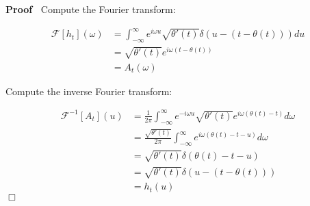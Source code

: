 \documentclass{article}
\newenvironment{proof}{\noindent\textbf{Proof\ }}{\hspace*{\fill}$\Box$\medskip}
\begin{document}
\begin{proof}
  Compute the Fourier transform:
  
  \begin{align}
    \mathcal{F} [h_t] (\omega) & = \int_{- \infty}^{\infty} e^{i \omega u} 
    \sqrt{\theta' (t)} \delta (u - (t - \theta (t))) du \\
    & = \sqrt{\theta' (t)} e^{i \omega (t - \theta (t))} \\
    & = A_t (\omega) 
  \end{align}
  
  Compute the inverse Fourier transform:
  
  \begin{align}
    \mathcal{F}^{- 1} [A_t] (u) & = \frac{1}{2 \pi}  \int_{- \infty}^{\infty}
    e^{- i \omega u}  \sqrt{\theta' (t)} e^{i \omega (\theta (t) - t)} d
    \omega \\
    & = \frac{\sqrt{\theta' (t)}}{2 \pi}  \int_{- \infty}^{\infty} e^{i
    \omega (\theta (t) - t - u)} d \omega \\
    & = \sqrt{\theta' (t)} \delta (\theta (t) - t - u) \\
    & = \sqrt{\theta' (t)} \delta (u - (t - \theta (t))) \\
    & = h_t (u) 
  \end{align}
\end{proof}
\end{document}
